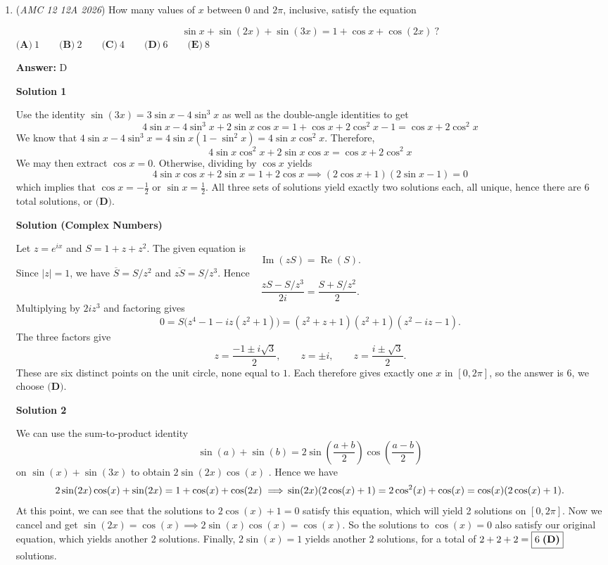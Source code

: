 \begin{enumerate}
 


	\item (\textit{AMC 12 12A 2026}) How many values of $x$ between $0$ and $2\pi$, inclusive, satisfy the equation

 \[\sin x + \sin(2x) + \sin(3x) = 1 + \cos x + \cos(2x)\ ?\]
$\textbf{(A)}\   1  \qquad 	\textbf{(B)}\   2  \qquad 	\textbf{(C)}\   4  \qquad 	\textbf{(D)}\   6  \qquad 	\textbf{(E)}\   8$

 \textbf{Answer: }D



\textbf{Solution 1}

Use the identity $\sin(3x)=3\sin x-4\sin^3 x$ as well as the double-angle identities to get
 \[4\sin x-4\sin^3x +2\sin x\cos x=1+\cos x+2\cos^2x-1=\cos x+2\cos^2 x\]We know that $4\sin x-4\sin^3x=4\sin x(1-\sin^2x)=4\sin x \cos^2 x$. Therefore,
 \[4\sin x\cos^2 x+2\sin x\cos x=\cos x+2\cos^2 x\]We may then extract $\cos x=0$. Otherwise, dividing by $\cos x$ yields
 \[4\sin x\cos x+2\sin x=1+2\cos x\implies (2\cos x+1)(2\sin x-1)=0\]which implies that $\cos x=-\frac{1}{2}$ or $\sin x=\frac{1}{2}$. All three sets of solutions yield exactly two solutions each, all unique, hence there are $6$ total solutions, or $\boxed{\textbf{(D)}}$.

 



\textbf{Solution (Complex Numbers)}

Let $z=e^{ix}$ and $S=1+z+z^2$. The given equation is
 \[\operatorname{Im}(zS)=\operatorname{Re}(S).\]Since $|z|=1$, we have $\overline S=S/z^2$ and $\overline{zS}=S/z^3$. Hence
 \[\frac{zS-S/z^3}{2i}=\frac{S+S/z^2}{2}.\]Multiplying by $2iz^3$ and factoring gives
 \[0=S\bigl(z^4-1-iz(z^2+1)\bigr) =(z^2+z+1)(z^2+1)(z^2-iz-1).\]The three factors give
 \[z=\frac{-1\pm i\sqrt3}{2}, \qquad z=\pm i, \qquad z=\frac{i\pm\sqrt3}{2}.\]These are six distinct points on the unit circle, none equal to $1$. Each therefore gives exactly one $x$ in $[0,2\pi]$, so the answer is $\boxed{6}$, we choose $\boxed{\textbf{(D)}}$.

 


 



\textbf{Solution 2}

We can use the sum-to-product identity 
 \[\sin(a)+\sin(b)=2\sin\left(\frac{a+b}2\right)\cos\left(\frac{a-b}2\right)\] on $\sin(x)+\sin(3x)$ to obtain $2\sin(2x)\cos(x)$ . Hence we have 
 \[2\sin(2x)\cos(x)+\sin(2x)=1+\cos(x)+\cos(2x)\implies \\  \sin(2x)(2\cos(x)+1)=2\cos^2(x)+\cos(x)=\cos(x)(2\cos(x)+1).\] At this point, we can see that the solutions to $2\cos(x)+1=0$ satisfy this equation, which will yield 2 solutions on $[0, 2\pi]$. Now we cancel and get $\sin(2x)=\cos(x)\implies 2\sin(x)\cos(x)=\cos(x)$. So the solutions to $\cos(x)=0$ also satisfy our original equation, which yields another 2 solutions. Finally, $2\sin(x)=1$ yields another 2 solutions, for a total of $2+2+2=\boxed{6\hspace{1mm}\textbf{(D)}}$ solutions.


\end{enumerate}
